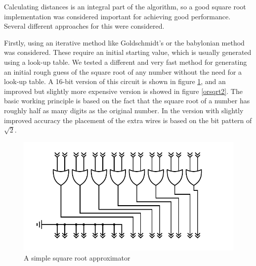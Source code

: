 			Calculating distances is an integral part of the algorithm, so a
			good square root implementation was considered important for
			achieving good performance. Several different approaches for this
			were considered.

			Firstly, using an iterative method like Goldschmidt's or the
			babylonian method was considered. These require an initial starting
			value, which is usually generated using a look-up table. We tested
			a different and very fast method for generating an initial rough
			guess of the square root of any number without the need for a
			look-up table. A 16-bit version of this circuit is shown in figure
			\ref{orsqrt}, and an improved but slightly more expensive version
			is showed in figure \ref{orsqrt2}.  The basic working principle is
			based on the fact that the square root of a number has roughly half
			as many digits as the original number. In the version with slightly
			improved accuracy the placement of the extra wires is based on the
			bit pattern of $\sqrt{2}$.

			\begin{figure}
				\centering
				\caption{A simple square root approximator}
				\label{orsqrt}
				\includegraphics[width=0.75\linewidth]{figure/pdf/simpleOr.pdf} 
			\end{figure}

